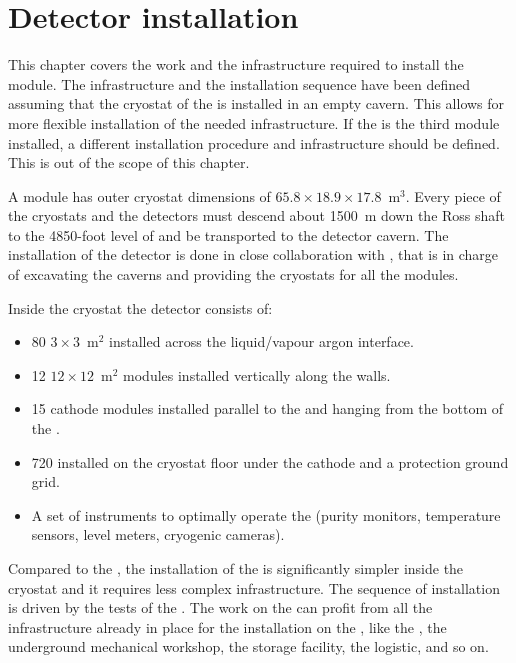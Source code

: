 \chapter{Detector installation}
\label{ch:dp-installation}

This chapter covers the work and the infrastructure required to install the    module.
The infrastructure and the installation sequence have been defined assuming that the cryostat of the  is installed in an empty cavern.
This allows for more flexible installation of the needed infrastructure.
If the  is the third module installed, a different installation procedure and infrastructure should be defined.
This is out of the scope of this chapter.

A   module has outer cryostat dimensions of $65.8 \times 18.9 \times 17.8$~m$^3$.
Every piece of the cryostats and the detectors must descend about 1500~m down the Ross shaft to the 4850-foot level of  and be transported to the detector cavern.
The installation of the detector is done in close collaboration with , that is in charge of  excavating the caverns and providing the cryostats for all the  modules.

Inside the cryostat the  detector consists of:
\begin{itemize}
\item 80 $3 \times 3$~m$^2$  installed across the liquid/vapour argon interface.
\item  12 $12 \times 12$~m$^2$  modules installed vertically along the walls.
\item  15 cathode modules  installed parallel to the  and hanging from the bottom of the .
\item  720  installed on the cryostat floor under the cathode and a protection ground grid.
\item  A set of instruments to optimally operate the  (purity monitors, temperature sensors, level meters, cryogenic cameras).
\end{itemize}

Compared to the , the installation of the  is significantly simpler inside the cryostat and it requires less complex infrastructure.
The sequence of installation is driven by the tests of the .
The work on the  can profit from all the infrastructure already in place for the installation on the , like the , the underground mechanical workshop, the storage facility, the logistic, and so on.

